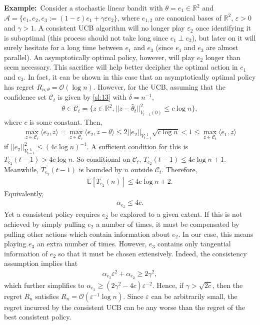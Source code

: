 \documentclass[10pt,a4article]{amsart}
\numberwithin{equation}{section}
\theoremstyle{plain}
\theoremstyle{definition}
\def\R{{\mathbb R}}
\def\E{{\mathbb E}}
\def\R{{\mathbb R}}
\def\e{{\varepsilon}}
\def\t{{\theta}}
\begin{document}
\medskip

\textbf{Example:}\ 
Consider a stochastic linear bandit with $\t=e_1\in\R^2$ and $\mathcal A=\{e_1, e_2, e_3:=(1-\e)e_1+\gamma\e e_2\}$, where $e_{1,2}$ are canonical bases of $\R^2$, $\e>0$ and $\gamma>1$. A consistent UCB algorithm will no longer play $\e_2$ once identifying it is suboptimal (this process should not take long since $e_1\perp e_2$), but later on it will surely hesitate for a long time between $e_1$ and $e_3$ (since $e_1$ and $e_3$ are almost parallel). An asymptotically optimal policy, however, will play $e_2$ longer than seem necessary. This sacrifice will help better decipher the optimal action in $e_1$ and $e_3$. In fact, it can be shown in this case that an asymptotically optimal policy has regret $R_{n,\t}=\mathcal O(\log n)$. However, for the UCB, assuming that the confidence set $\mathcal C_t$ is given by \eqref{sl:13} with $\delta = n^{-1}$, 
\begin{align*}
\t\in\mathcal C_t = \{z\in\R^2, ||z-\hat{\t}_t||^2_{V_{t-1}(0)}\leq c\log n\},
\end{align*}
where $c$ is some constant. Then,
\begin{align*}
\max_{z\in\mathcal C_t}\langle e_2, z\rangle=\max_{z\in\mathcal C_t}\langle e_2, z-\t\rangle\leq 2||e_2||_{V^{-1}_{t-1}}\sqrt{c\log n}< 1\leq \max_{z\in\mathcal C_t}\langle e_1, z\rangle 
\end{align*}
if $||e_2||^2_{V_{t-1}^{-1}}\leq (4c\log n)^{-1}$. A sufficient condition for this is $T_{e_2}(t-1)> 4c\log n$. So conditional on $\mathcal C_t$, $T_{e_2}(t-1)\leq 4c\log n + 1$. Meanwhile, $T_{e_2}(t-1)$ is bounded by $n$ outside $\mathcal C_t$. Therefore,  
\begin{align*}
\E[T_{e_2}(n)]\leq 4c\log n + 2. 
\end{align*}
Equivalently, 
\begin{align*}
\alpha_{e_2}\leq 4c. 
\end{align*}
Yet a consistent policy requires $e_2$ be explored to a given extent. If this is not achieved by simply pulling $e_2$ a number of times,  it must be compensated by pulling other actions which contain information about $e_2$. In our case, this means playing $e_3$ an extra number of times. However, $e_3$ contains only tangential information of $e_2$ so that it must be chosen extensively. Indeed, the consistency assumption implies that 
\begin{align*}
\alpha_{e_3}\e^2+\alpha_{e_2}\geq  2\gamma^2, 
\end{align*}
which further simplifies to $\alpha_{e_3}\geq (2\gamma^2-4c)\e^{-2}$. Hence, if $\gamma>\sqrt{2c}$, then the regret $R_n$ satisfies $R_n = \mathcal O(\e^{-1}\log n)$. Since $\e$ can be arbitrarily small, the regret incurred by the consistent UCB can be any worse than the regret of the best consistent policy. 
\end{document}
